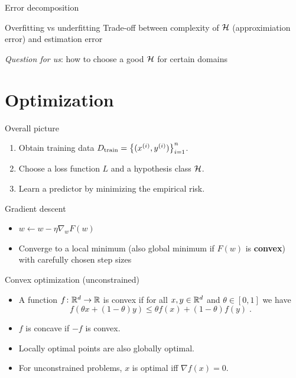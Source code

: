 \documentclass[usenames,dvipsnames,notes]{beamer}
\begin{document}
\begin{frame}
    {Error decomposition}
\end{frame}

\begin{frame}
    {Overfitting vs underfitting}
    Trade-off between complexity of $\mathcal{H}$ (approximiation error) and estimation error

    \vspace{10em}
    \emph{Question for us}: how to choose a good $\mathcal{H}$ for certain domains
\end{frame}

\section{Optimization}

\begin{frame}
    {Overall picture}
    \begin{enumerate}
        \itemsep2em
        \item Obtain training data $D_{\text{train}}=\left\{ (x^{(i)}, y^{(i)}) \right\}_{i=1}^n$.
        \item Choose a loss function $L$ and a hypothesis class $\mathcal{H}$.
        \item Learn a predictor by minimizing the empirical risk.
    \end{enumerate}
\end{frame}

\begin{frame}
    {Gradient descent}
    \begin{itemize}
        \item $w \leftarrow w - \eta\nabla_w F(w)$
        \item Converge to a local minimum (also global minimum if $F(w)$ is \textbf{convex}) with carefully chosen step sizes
    \end{itemize}
    \vspace{10em}
\end{frame}

\begin{frame}
    {Convex optimization (unconstrained)}
    \begin{itemize}
        \item A function $f\colon \mathbb{R}^d \rightarrow \mathbb{R}$ is convex if for all $x,y \in \mathbb{R}^d$ and $\theta \in [0,1]$ we have
            $$
            f(\theta x + (1-\theta)y) \le \theta f(x) + (1-\theta) f(y)  \;.
            $$
        \item $f$ is concave if $-f$ is convex.\\
        \vspace{6em}
        \item Locally optimal points are also globally optimal.
        \item For unconstrained problems, $x$ is optimal iff $\nabla f(x) = 0$.
    \end{itemize}
\end{frame}
\end{document}
